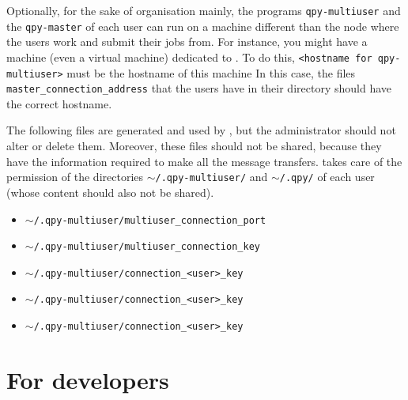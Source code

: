 \documentclass[a4paper,12pt]{article}
\begin{document}
\begin{itemize}
  Optionally, for the sake of organisation mainly, the programs \texttt{qpy-multiuser} and the \texttt{qpy-master} of each user can run on a machine different than the node where the users work and submit their jobs from.
  For instance, you might have a machine (even a virtual machine) dedicated to \qpy{}.
  To do this, \texttt{<hostname for qpy-multiuser>} must be the hostname of this machine
  In this case, the files \texttt{master\_connection\_address} that the users have in their \qpy{} directory should have the correct hostname.
  
\end{itemize}

The following files are generated and used by \qpy{}, but the administrator should not alter or delete them.
Moreover, these files should not be shared, because they have the information required to make all the message transfers.
\qpy{} takes care of the permission of the directories \texttt{$\sim$/.qpy-multiuser/} and \texttt{$\sim$/.qpy/} of each user (whose content should also not be shared).

\begin{itemize}
\item \texttt{$\sim$/.qpy-multiuser/multiuser\_connection\_port}
\item \texttt{$\sim$/.qpy-multiuser/multiuser\_connection\_key}
\item \texttt{$\sim$/.qpy-multiuser/connection\_<user>\_key}
\item \texttt{$\sim$/.qpy-multiuser/connection\_<user>\_key}
\item \texttt{$\sim$/.qpy-multiuser/connection\_<user>\_key}
\end{itemize}




\newpage
\section{For developers}





\linespread{0.8}
\end{document}
